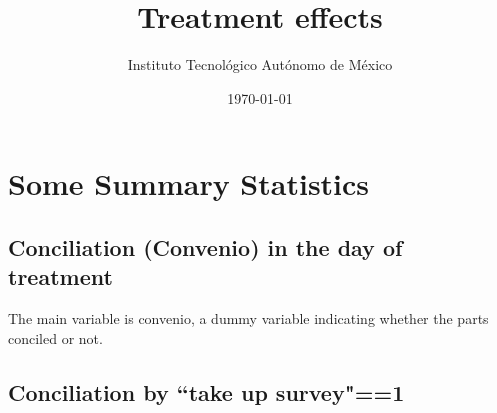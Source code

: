 \documentclass[12pt]{article}
\theoremstyle{named}
\newcommand{\folder}{./Effect}
\begin{document}
\title{Treatment effects}

\author{Instituto Tecnológico Autónomo de México}
\date{\today}
\maketitle


\hrulefill


\section{\Huge{Some Summary Statistics}}

\vspace{7mm}


\subsection*{Conciliation (Convenio) in the day of treatment}

The main variable is convenio, a dummy variable indicating whether the parts conciled or not.\\

\begin{center}
\scriptsize{}
\end{center}

\begin{center}
\scriptsize{}
\end{center}

\begin{center}
\scriptsize{}
\end{center}

\begin{center}
\scriptsize{}
\end{center}

\vspace{5mm}


\pagebreak


\subsection*{Conciliation by ``take up survey"==1}


\scriptsize{}

\scriptsize{}

\scriptsize{}
\end{document}
